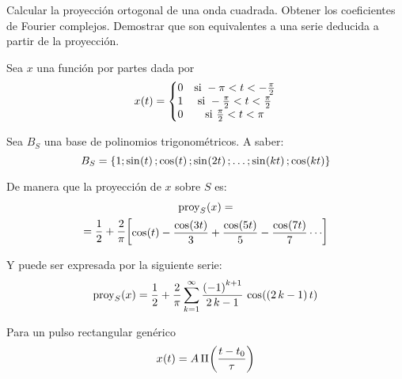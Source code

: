 \begin{mdframed}[style=ExampleFrame]
    \begin{example}
    \end{example}
    \begin{formatI}
        Calcular la proyección ortogonal de una onda cuadrada. Obtener los coeficientes de Fourier complejos. Demostrar que son equivalentes a una serie deducida a partir de la proyección.
    \end{formatI}
    \vspace{1em}
    Sea $x$ una función por partes dada por
    \begin{equation*}
        \fx[x]{t} =
        \left\{
        \begin{matrix}
            0 & \text{si } -\pi < t < -\frac{\pi}{2}
            \\
            1 & \text{si } -\frac{\pi}{2} < t < \frac{\pi}{2}
            \\
            0 & \text{si } \frac{\pi}{2} < t < \pi
        \end{matrix}
        \right.
    \end{equation*}
    
    Sea $B_S$ una base de polinomios trigonométricos. A saber:
    \begin{equation*}
        B_S = \inBraces{1; \fx[\sin]{t}; \fx[\cos]{t}; \fx[\sin]{2t}; \dots; \fx[\sin]{\kth t}; \fx[\cos]{\kth t}}
    \end{equation*}
    
    De manera que la proyección de $x$ sobre $S$ es:
    \begin{multline*}
        \fx[\proy_S]{x} =
        \\
        = \frac{1}{2} + \frac{2}{\pi} \inBrackets{\fx[\cos]{t} - \dfrac{\fx[\cos]{3t}}{3} + \dfrac{\fx[\cos]{5t}}{5} - \dfrac{\fx[\cos]{7t}}{7} \cdots}
    \end{multline*}

    Y puede ser expresada por la siguiente serie:
    \begin{equation}
        \fx[\proy_S]{x} = \frac{1}{2} + \frac{2}{\pi} \sum_{\kth=1}^\infty \frac{\inParentheses{-1}^{\kth+1}}{2 \, \kth - 1} \, \fx[\cos]{\inParentheses{2 \, \kth -1} t}
        \label{eqn:FourierProy}
    \end{equation}

    Para un pulso rectangular genérico
    \begin{equation*}
        \fx[x]{t} = A \, \fx[\Pi]{\frac{t-t_0}{\tau}}
    \end{equation*}
    

\end{mdframed}
